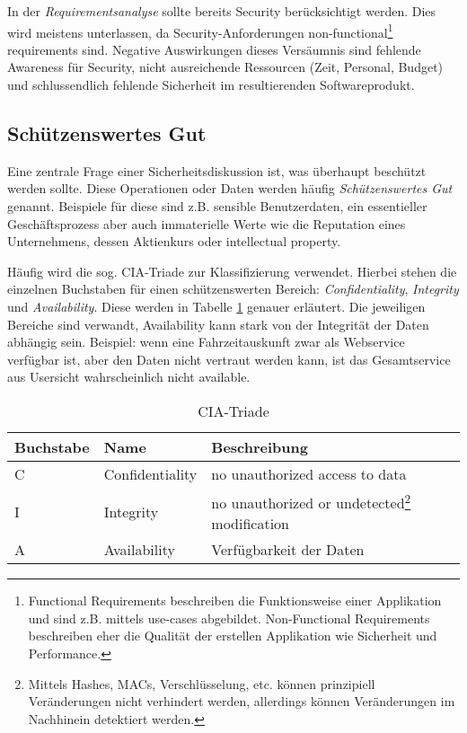 In der \textit{Requirementsanalyse} sollte bereits Security berücksichtigt werden. Dies wird meistens unterlassen, da Security-Anforderungen non-functional\footnote{Functional Requirements beschreiben die Funktionsweise einer Applikation und sind z.B. mittels use-cases abgebildet. Non-Functional Requirements beschreiben eher die Qualität der erstellen Applikation wie Sicherheit und Performance.} requirements sind. Negative Auswirkungen dieses Versäumnis sind fehlende Awareness für Security, nicht ausreichende Ressourcen (Zeit, Personal, Budget) und schlussendlich fehlende Sicherheit im resultierenden Softwareprodukt.

\subsection{Schützenswertes Gut}

Eine zentrale Frage einer Sicherheitsdiskussion ist, was überhaupt beschützt werden sollte. Diese Operationen oder Daten werden häufig \textit{Schützenswertes Gut} genannt. Beispiele für diese sind z.B. sensible Benutzerdaten, ein essentieller Geschäftsprozess aber auch immaterielle Werte wie die Reputation eines Unternehmens, dessen Aktienkurs oder intellectual property.

Häufig wird die sog. CIA-Triade zur Klassifizierung verwendet. Hierbei stehen die einzelnen Buchstaben für einen schützenswerten Bereich: \textit{Confidentiality}, \textit{Integrity} und \textit{Availability}. Diese werden in Tabelle \ref{tbl:cia_triad} genauer erläutert. Die jeweiligen Bereiche sind verwandt, Availability kann stark von der Integrität der Daten abhängig sein. Beispiel: wenn eine Fahrzeitauskunft zwar als Webservice verfügbar ist, aber den Daten nicht vertraut werden kann, ist das Gesamtservice aus Usersicht wahrscheinlich nicht available.

\begin{table}
	\begin{center}
\begin{tabular}{llp{5cm}}
	\toprule
	Buchstabe & Name & Beschreibung \\
	\midrule
	C & Confidentiality & no unauthorized access to data \\
	I & Integrity & no unauthorized or undetected\footnote{Mittels Hashes, MACs, Verschlüsselung, etc. können prinzipiell Veränderungen nicht verhindert werden, allerdings können Veränderungen im Nachhinein detektiert werden.} modification \\
	A & Availability & Verfügbarkeit der Daten \\
	\bottomrule
\end{tabular}
\end{center}
\caption{CIA-Triade}
\label{tbl:cia_triad}
\end{table}


